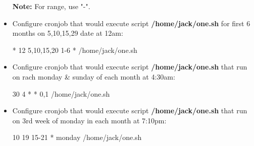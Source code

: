 \begin{flushleft}
\begin{itemize}
		\begin{tcolorbox}[breakable,notitle,boxrule=-0pt,colback=yellow,colframe=yellow]
			\color{black}
			\textbf{Note:} For range, use "-".
		\end{tcolorbox}
	
		\bigskip
		\bigskip
		\item Configure cronjob that would execute script \textbf{/home/jack/one.sh} for first 6 months on 5,10,15,29 date at 12am:
		\begin{tcolorbox}[breakable,notitle,boxrule=-0pt,colback=teal,colframe=teal]
			\color{white}
			\font=9pt
			*     12    5,10,15,20   1-6  *     /home/jack/one.sh
			\font=4pt
		\end{tcolorbox}
		
		\bigskip
		\bigskip
		\item Configure cronjob that would execute script \textbf{/home/jack/one.sh} that run on rach monday \& sunday of each month at 4:30am:	
		\begin{tcolorbox}[breakable,notitle,boxrule=-0pt,colback=teal,colframe=teal]
			\color{white}
			\font=9pt
			30     4    *  *   0,1     /home/jack/one.sh
			\font=4pt
		\end{tcolorbox}
		
		\bigskip
		\bigskip
		\item Configure cronjob that would execute script \textbf{/home/jack/one.sh} that run on 3rd week of monday in each month at 7:10pm:
		\begin{tcolorbox}[breakable,notitle,boxrule=-0pt,colback=teal,colframe=teal]
			\color{white}
			\font=9pt
			10   19  15-21  *  monday     /home/jack/one.sh
			\font=4pt
		\end{tcolorbox}
		
	
	\end{itemize}

	 


\end{flushleft}
\newpage


